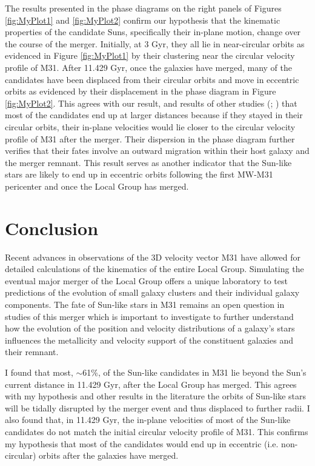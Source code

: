 \documentclass{aastex63}
\begin{document}
The results presented in the phase diagrams on the right panels of Figures \ref{fig:MyPlot1} and \ref{fig:MyPlot2} confirm our hypothesis that the kinematic properties of the candidate Suns, specifically their in-plane motion, change over the course of the merger. Initially, at 3 Gyr, they all lie in near-circular orbits as evidenced in Figure \ref{fig:MyPlot1} by their clustering near the circular velocity profile of M31. After 11.429 Gyr, once the galaxies have merged, many of the candidates have been displaced from their circular orbits and move in eccentric orbits as evidenced by their displacement in the phase diagram in Figure \ref{fig:MyPlot2}. This agrees with our result, and results of other studies (\cite{2012ApJ...753....9V}; \cite{2008MNRAS.386..461C}) that most of the candidates end up at larger distances because if they stayed in their circular orbits, their in-plane velocities would lie closer to the circular velocity profile of M31 after the merger. Their dispersion in the phase diagram further verifies that their fates involve an outward migration within their host galaxy and the merger remnant. This result serves as another indicator that the Sun-like stars are likely to end up in eccentric orbits following the first MW-M31 pericenter and once the Local Group has merged.

\section{Conclusion}
Recent advances in observations of the 3D velocity vector M31 have allowed for detailed calculations of the kinematics of the entire Local Group. Simulating the eventual major merger of the Local Group offers a unique laboratory to test predictions of the evolution of small galaxy clusters and their individual galaxy components. The fate of Sun-like stars in M31 remains an open question in studies of this merger which is important to investigate to further understand how the evolution of the position and velocity distributions of a galaxy's stars influences the metallicity and velocity support of the constituent galaxies and their remnant. 

I found that most, $\sim$61\%, of the Sun-like candidates in M31 lie beyond the Sun's current distance in 11.429 Gyr, after the Local Group has merged. This agrees with my hypothesis and other results in the literature the orbits of Sun-like stars will be tidally disrupted by the merger event and thus displaced to further radii. I also found that, in 11.429 Gyr, the in-plane velocities of most of the Sun-like candidates do not match the initial circular velocity profile of M31. This confirms my hypothesis that most of the candidates would end up in eccentric (i.e. non-circular) orbits after the galaxies have merged.
\end{document}
